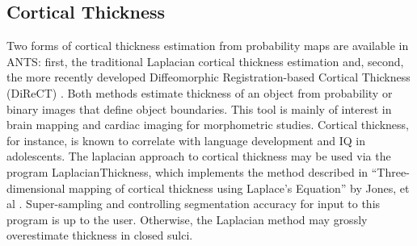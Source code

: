 \documentclass{InsightArticle}
\begin{document}
\subsection{Cortical Thickness}
Two forms of cortical thickness estimation from probability maps are available 
in ANTS: first, the traditional Laplacian cortical thickness estimation and, second, 
the more recently developed Diffeomorphic Registration-based Cortical Thickness 
(DiReCT) \cite{Das2009}.  Both methods estimate thickness of an object 
from probability or binary images that define object boundaries.  This tool 
is mainly of interest in brain mapping and cardiac imaging for morphometric 
studies.  Cortical thickness, for instance, is known to correlate with language 
development and IQ in adolescents.  The laplacian approach to 
cortical thickness may be used via the program LaplacianThickness, 
which implements the method described in ``Three-dimensional mapping of cortical thickness using Laplace's Equation'' by 
Jones, et al \cite{}.  Super-sampling 
and controlling segmentation accuracy for input to this program is up 
to the user.  Otherwise, the Laplacian method may grossly overestimate 
thickness in closed sulci.  

 
\end{document}
